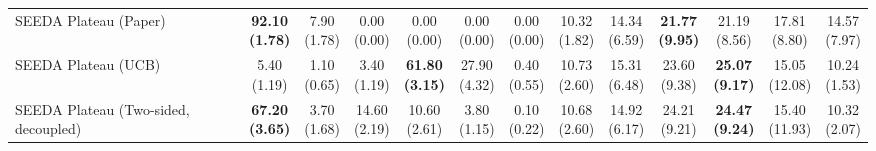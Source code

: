 \begin{table}[H]
{\begin{tabular}{l|cccccc|cccccc}
SEEDA Plateau (Paper) & \bfseries \makecell{92.10 \\ (1.78)} & \makecell{7.90 \\ (1.78)} & {\cellcolor[HTML]{C8E6C9}} \makecell{0.00 \\ (0.00)} & \makecell{0.00 \\ (0.00)} & \makecell{0.00 \\ (0.00)} & \makecell{0.00 \\ (0.00)} & \makecell{10.32 \\ (1.82)} & \makecell{14.34 \\ (6.59)} & {\cellcolor[HTML]{C8E6C9}} \bfseries \makecell{21.77 \\ (9.95)} & \makecell{21.19 \\ (8.56)} & \makecell{17.81 \\ (8.80)} & \makecell{14.57 \\ (7.97)} \\
SEEDA Plateau (UCB) & \makecell{5.40 \\ (1.19)} & \makecell{1.10 \\ (0.65)} & {\cellcolor[HTML]{C8E6C9}} \makecell{3.40 \\ (1.19)} & \bfseries \makecell{61.80 \\ (3.15)} & \makecell{27.90 \\ (4.32)} & \makecell{0.40 \\ (0.55)} & \makecell{10.73 \\ (2.60)} & \makecell{15.31 \\ (6.48)} & {\cellcolor[HTML]{C8E6C9}} \makecell{23.60 \\ (9.38)} & \bfseries \makecell{25.07 \\ (9.17)} & \makecell{15.05 \\ (12.08)} & \makecell{10.24 \\ (1.53)} \\
SEEDA Plateau (Two-sided, decoupled) & \bfseries \makecell{67.20 \\ (3.65)} & \makecell{3.70 \\ (1.68)} & {\cellcolor[HTML]{C8E6C9}} \makecell{14.60 \\ (2.19)} & \makecell{10.60 \\ (2.61)} & \makecell{3.80 \\ (1.15)} & \makecell{0.10 \\ (0.22)} & \makecell{10.68 \\ (2.60)} & \makecell{14.92 \\ (6.17)} & {\cellcolor[HTML]{C8E6C9}} \makecell{24.21 \\ (9.21)} & \bfseries \makecell{24.47 \\ (9.24)} & \makecell{15.40 \\ (11.93)} & \makecell{10.32 \\ (2.07)} \\

\end{tabular}}
\end{table}
